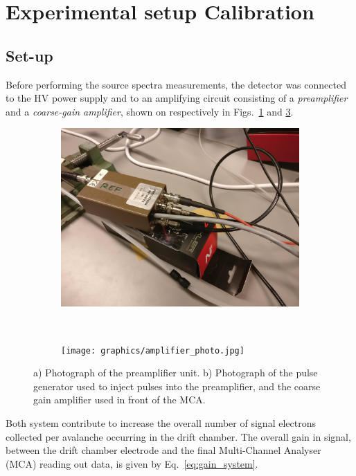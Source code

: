 \section{Experimental setup Cali\-bra\-ti\-on}

\subsection{Set-up}
\label{sec:calibration:set-up}
Before performing the source spectra measurements, the detector was connected to the HV power supply and to an amplifying circuit consisting of a \textit{preamplifier} and a \textit{coarse-gain amplifier}, shown on respectively in Figs.~\ref{fig:preamp_photo} and \ref{fig:ampli_gene}. 

\begin{figure}[htb]
  \begin{subfigure}[b]{0.45\textwidth}
    \includegraphics[width=\textwidth]{graphics/preamplifier.jpg}
    \caption{}
    \label{fig:preamp_photo}
  \end{subfigure}
  ~
  \begin{subfigure}[b]{0.45\textwidth}
    \texttt{[image: graphics/amplifier\_photo.jpg]}
    \caption{}
    \label{fig:ampli_gene}
  \end{subfigure}
  \caption{a) Photograph of the preamplifier unit. b) Photograph of the pulse generator used to inject pulses into the preamplifier, and the coarse gain amplifier used in front of the MCA.}
\end{figure}

Both system contribute to increase the overall number of signal electrons collected per avalanche occurring in the drift chamber. The overall gain in signal, between the drift chamber electrode and the final Multi-Channel Analyser (MCA) reading out data, is given by Eq.~\ref{eq:gain_system}.

